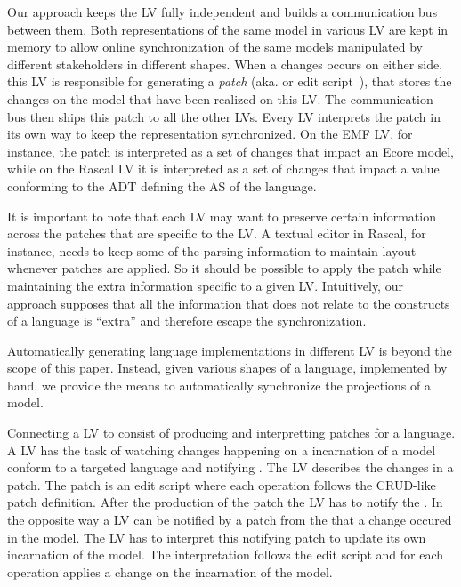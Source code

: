 Our approach keeps the LV fully independent and builds a communication bus between them.
Both representations of the same model in various LV are kept in memory to allow online synchronization of the same models manipulated by different stakeholders in different shapes.
When a changes occurs on either side, this LV is responsible for generating a \emph{patch} (aka. \de or edit script~\cite{rozen2017towards}), that stores the changes on the model that have been realized on this LV.
The communication bus then ships this patch to all the other LVs.
Every LV interprets the patch in its own way to keep the representation synchronized.
On the EMF LV, for instance, the patch is interpreted as a set of changes that impact an Ecore model, while on the Rascal LV it is interpreted as a set of changes that impact a value conforming to the ADT defining the AS of the language.

It is important to note that each LV may want to preserve certain information across the patches that are specific to the LV.
A textual editor in Rascal, for instance, needs to keep some of the parsing information to maintain layout whenever patches are applied.
So it should be possible to apply the patch while maintaining the extra information specific to a given LV.
Intuitively, our approach supposes that all the information that does not relate to the constructs of a language is ``extra'' and therefore escape the synchronization. 

Automatically generating language implementations in different LV is beyond the scope of this paper.
Instead, given various shapes of a language, implemented by hand, we provide the means to automatically synchronize the projections of a model.

Connecting a LV to \prism consist of producing and interpretting patches for a language.
A LV has the task of watching changes happening on a incarnation of a model conform to a targeted language and notifying \prism.
The LV describes the changes in a patch. The patch is an edit script where each operation follows the CRUD-like patch definition.
After the production of the patch the LV has to notify the \prism.
In the opposite way a LV can be notified by a patch from the \prism that a change occured in the model.
The LV has to interpret this notifying patch to update its own incarnation of the model.
The interpretation follows the edit script and for each operation applies a change on the incarnation of the model.

